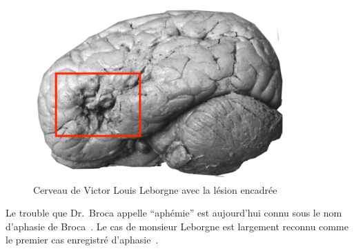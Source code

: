 \begin{figure}[htb]
    \begin{center}
        \includegraphics[width=10cm]{assets/images/leborgne-brain.png}
    \end{center}
    \caption{Cerveau de Victor Louis Leborgne avec la lésion encadrée}
    \label{fig.leborgne-brain}
\end{figure}

Le trouble que Dr.~Broca appelle ``aphémie'' 
est aujourd'hui connu sous le nom d'aphasie de Broca~\cite{Lorch_2011}.
Le cas de monsieur Leborgne est largement reconnu 
comme le premier cas enregistré d'aphasie~\cite{Mohammed_Narayan_Patra_Nanda_2018}.